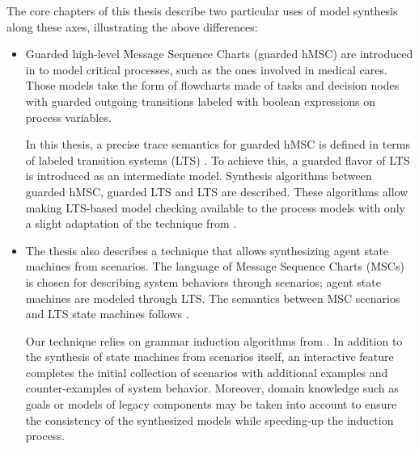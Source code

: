 The core chapters of this thesis describe two particular uses of model synthesis along these axes, illustrating the above differences:
\begin{itemize}
\item Guarded high-level Message Sequence Charts (guarded hMSC) are introduced in \cite{Damas:2010, Damas:2011} to model critical processes, such as the ones involved in medical cares. Those models take the form of flowcharts made of tasks and decision nodes with guarded outgoing transitions labeled with boolean expressions on process variables. 

In this thesis, a precise trace semantics for guarded hMSC is defined in terms of labeled transition systems (LTS) \cite{Keller:1976, Magee:1999}. To achieve this, a guarded flavor of LTS is introduced as an intermediate model. Synthesis algorithms between guarded hMSC, guarded LTS and LTS are described. These algorithms allow making LTS-based model checking available to the process models with only a slight adaptation of the technique from \cite{Giannakopoulou:2003}.

\item The thesis also describes a technique that allows synthesizing agent state machines from scenarios. The language of Message Sequence Charts (MSCs) is chosen for describing system behaviors through scenarios; agent state machines are modeled through LTS. The semantics between MSC scenarios and LTS state machines follows \cite{Uchitel:2003}.

Our technique relies on grammar induction algorithms from \cite{Oncina:1992, Lang:1998}. In addition to the synthesis of state machines from scenarios itself, an interactive feature completes the initial collection of scenarios with additional examples and counter-examples of system behavior. Moreover, domain knowledge such as goals or models of legacy components may be taken into account to ensure the consistency of the synthesized models while speeding-up the induction process.
\end{itemize}
